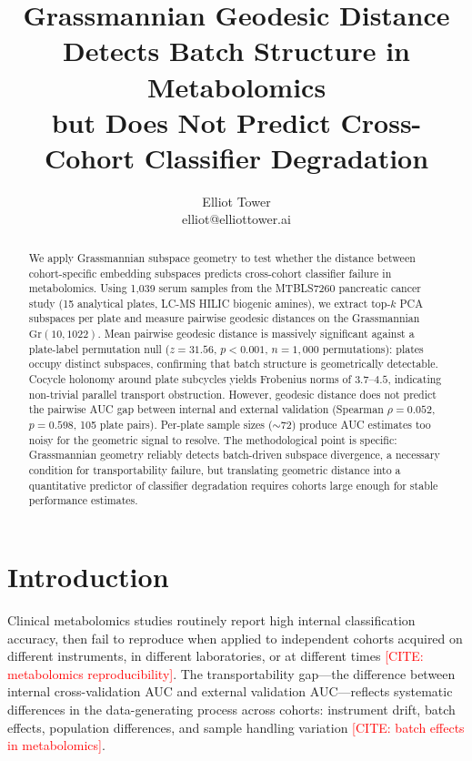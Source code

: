 \documentclass{article}
\title{Grassmannian Geodesic Distance Detects Batch Structure in Metabolomics\\but Does Not Predict Cross-Cohort Classifier Degradation}
\author{\name Elliot Tower \\
      \email elliot@elliottower.ai}
\begin{document}
\maketitle

\begin{abstract}
We apply Grassmannian subspace geometry to test whether the distance between cohort-specific embedding subspaces predicts cross-cohort classifier failure in metabolomics. Using 1{,}039 serum samples from the MTBLS7260 pancreatic cancer study (15 analytical plates, LC-MS HILIC biogenic amines), we extract top-$k$ PCA subspaces per plate and measure pairwise geodesic distances on the Grassmannian $\mathrm{Gr}(10, 1022)$. Mean pairwise geodesic distance is massively significant against a plate-label permutation null ($z = 31.56$, $p < 0.001$, $n = 1{,}000$ permutations): plates occupy distinct subspaces, confirming that batch structure is geometrically detectable. Cocycle holonomy around plate subcycles yields Frobenius norms of $3.7$--$4.5$, indicating non-trivial parallel transport obstruction. However, geodesic distance does not predict the pairwise AUC gap between internal and external validation (Spearman $\rho = 0.052$, $p = 0.598$, 105 plate pairs). Per-plate sample sizes ($\sim$72) produce AUC estimates too noisy for the geometric signal to resolve. The methodological point is specific: Grassmannian geometry reliably detects batch-driven subspace divergence, a necessary condition for transportability failure, but translating geometric distance into a quantitative predictor of classifier degradation requires cohorts large enough for stable performance estimates.
\end{abstract}

\section{Introduction}

Clinical metabolomics studies routinely report high internal classification accuracy, then fail to reproduce when applied to independent cohorts acquired on different instruments, in different laboratories, or at different times \textcolor{red}{[CITE: metabolomics reproducibility]}. The transportability gap---the difference between internal cross-validation AUC and external validation AUC---reflects systematic differences in the data-generating process across cohorts: instrument drift, batch effects, population differences, and sample handling variation \textcolor{red}{[CITE: batch effects in metabolomics]}.
\end{document}
